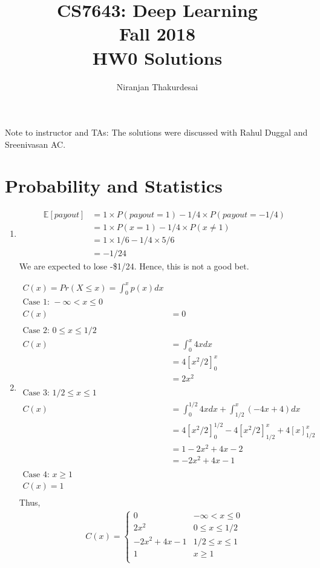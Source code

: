 \documentclass[11pt,english]{article}
\begin{document}
\title{CS7643: Deep Learning \\
Fall 2018\\ HW0 Solutions}
\author{Niranjan Thakurdesai}
\maketitle
Note to instructor and TAs: The solutions were discussed with Rahul Duggal and Sreenivasan AC.

\section{Probability and Statistics}
\begin{enumerate}
    \item \begin{align*}
    			\mathbb{E}[payout] &= 1\times P(payout = 1) - 1/4\times P(payout = -1/4) \\
    			&= 1\times P(x = 1) - 1/4\times P(x \neq 1) \\
    			&= 1\times 1/6 - 1/4\times 5/6 \\
    			&= -1/24
		\end{align*}
		We are expected to lose -\$1/24. Hence, this is not a good bet.
	\newpage
	
	\item \begin{align*}
	C(x) = Pr(X \leq x) = \int_{0}^{x} p(x) dx \\
	\text{Case 1: } -\infty < x \leq 0 \\
	C(x) &= 0 \\\\
	\text{Case 2: } 0 \leq x \leq 1/2 \\
	C(x) &= \int_{0}^{x} 4x dx \\
	&= 4[x^2/2]_{0}^{x} \\
	&= 2x^2 \\\\
	\text{Case 3: } 1/2 \leq x \leq 1 \\
	C(x) &= \int_{0}^{1/2} 4x dx + \int_{1/2}^{x} (-4x + 4) dx \\
	&= 4[x^2/2]_{0}^{1/2} - 4[x^2/2]_{1/2}^x + 4[x]_{1/2}^x \\
	&= 1 - 2x^2 + 4x - 2 \\
	&= -2x^2 + 4x - 1 \\\\
	\text{Case 4: } x \geq 1 \\
	C(x) = 1 \\
	\end{align*}
	Thus,
	\begin{align*}
	C(x) = 
	\begin{cases}
	0 & -\infty < x \leq 0 \\
	2x^2 & 0 \leq x \leq 1/2 \\
	-2x^2 + 4x - 1 & 1/2 \leq x \leq 1 \\
	1 & x \geq 1 \\
	\end{cases}
	\end{align*}
	\newpage
	

\end{enumerate}
\end{document}
